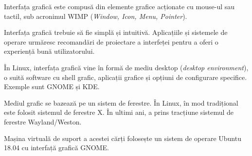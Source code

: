 Interfața grafică este compusă din elemente grafice acționate cu mouse-ul sau tactil, sub acronimul WIMP (\textit{Window, Icon, Menu, Pointer}).

Interfața grafică trebuie să fie simplă și intuitivă.
Aplicațiile și sistemele de operare urmăresc recomandări de proiectare a interfeței pentru a oferi o experiență bună utilizatorului.

În Linux, interfața grafică vine în formă de mediu desktop (\textit{desktop environment}), o suită software cu shell grafic, aplicații grafice și opțiuni de configurare specifice.
Exemple sunt GNOME și KDE.

Mediul grafic se bazează pe un sistem de ferestre.
În Linux, în mod tradițional este folosit sistemul de ferestre X.
În ultimi ani, a prins tracțiune sistemul de ferestre Wayland/Weston.

Mașina virtuală de suport a acestei cărți folosește un sistem de operare Ubuntu 18.04 cu interfață grafică GNOME.
